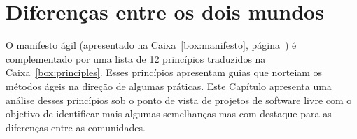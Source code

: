\chapter{Diferenças entre os dois mundos}
\label{cap:diferencas}

O manifesto ágil (apresentado na Caixa~\ref{box:manifesto},
página~\pageref{box:manifesto}) é complementado por uma lista de 12
princípios traduzidos na Caixa~\ref{box:principles}. Esses princípios
apresentam guias que norteiam os métodos ágeis na direção de algumas
práticas. Este Capítulo apresenta uma análise desses princípios sob o
ponto de vista de projetos de software livre com o objetivo de
identificar mais algumas semelhanças mas com destaque para as
diferenças entre as comunidades.

